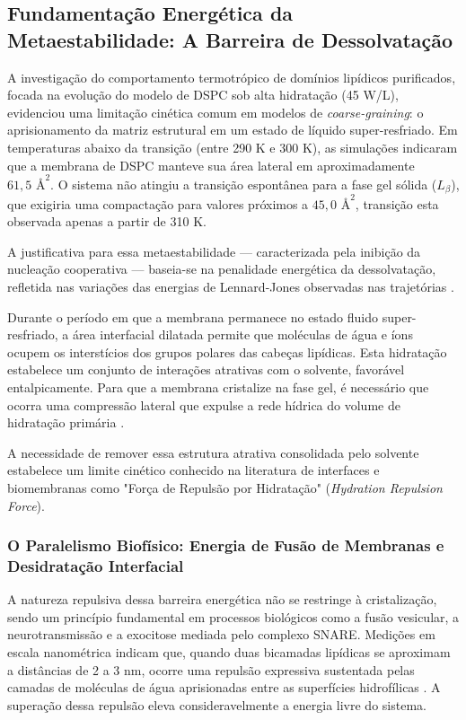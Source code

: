 \documentclass[12pt]{article} %
\begin{document}
\subsection{Fundamentação Energética da Metaestabilidade: A Barreira de Dessolvatação}

A investigação do comportamento termotrópico de domínios lipídicos purificados, focada na evolução do modelo de DSPC sob alta hidratação (45 W/L), evidenciou uma limitação cinética comum em modelos de \textit{coarse-graining}: o aprisionamento da matriz estrutural em um estado de líquido super-resfriado. Em temperaturas abaixo da transição (entre 290 K e 300 K), as simulações indicaram que a membrana de DSPC manteve sua área lateral em aproximadamente $61,5\text{ \AA}^2$. O sistema não atingiu a transição espontânea para a fase gel sólida ($L_\beta$), que exigiria uma compactação para valores próximos a $45,0\text{ \AA}^2$, transição esta observada apenas a partir de 310 K.

A justificativa para essa metaestabilidade — caracterizada pela inibição da nucleação cooperativa — baseia-se na penalidade energética da dessolvatação, refletida nas variações das energias de Lennard-Jones observadas nas trajetórias \cite{kowalik2015}.

Durante o período em que a membrana permanece no estado fluido super-resfriado, a área interfacial dilatada permite que moléculas de água e íons ocupem os interstícios dos grupos polares das cabeças lipídicas. Esta hidratação estabelece um conjunto de interações atrativas com o solvente, favorável entalpicamente. Para que a membrana cristalize na fase gel, é necessário que ocorra uma compressão lateral que expulse a rede hídrica do volume de hidratação primária \cite{kowalik2015}.

A necessidade de remover essa estrutura atrativa consolidada pelo solvente estabelece um limite cinético conhecido na literatura de interfaces e biomembranas como "Força de Repulsão por Hidratação" (\textit{Hydration Repulsion Force}).

\subsubsection*{O Paralelismo Biofísico: Energia de Fusão de Membranas e Desidratação Interfacial}

A natureza repulsiva dessa barreira energética não se restringe à cristalização, sendo um princípio fundamental em processos biológicos como a fusão vesicular, a neurotransmissão e a exocitose mediada pelo complexo SNARE. Medições em escala nanométrica indicam que, quando duas bicamadas lipídicas se aproximam a distâncias de 2 a 3 nm, ocorre uma repulsão expressiva sustentada pelas camadas de moléculas de água aprisionadas entre as superfícies hidrofílicas \cite{krok2024}. A superação dessa repulsão eleva consideravelmente a energia livre do sistema.
\end{document}
